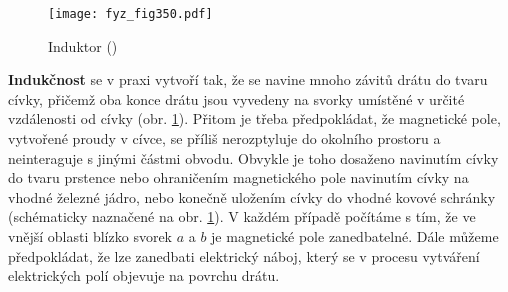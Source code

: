   \begin{figure}[ht!] %
    \centering
    \texttt{[image: fyz\_fig350.pdf]}
    \caption{Induktor
             (\cite[s.~391]{Feynman02})}
    \label{fyz:fig350}
  \end{figure}
   
  \textbf{Indukčnost} se v praxi vytvoří tak, že se navine mnoho závitů drátu do tvaru cívky, 
  přičemž oba konce drátu jsou vyvedeny na svorky umístěné v určité vzdálenosti od cívky (obr. 
  \ref{fyz:fig350}). Přitom je třeba předpokládat, že magnetické pole, vytvořené proudy v cívce, se 
  příliš nerozptyluje do okolního prostoru a neinteraguje s jinými částmi obvodu. Obvykle je toho 
  dosaženo navinutím cívky do tvaru prstence nebo ohraničením magnetického pole navinutím cívky na 
  vhodné železné jádro, nebo konečně uložením cívky do vhodné kovové schránky (schématicky 
  naznačené na obr. \ref{fyz:fig350}). V každém případě počítáme s tím, že ve vnější oblasti blízko 
  svorek \(a\) a \(b\) je magnetické pole zanedbatelné. Dále můžeme předpokládat, že lze zanedbati 
  elektrický náboj, který se v procesu vytváření elektrických polí objevuje na povrchu drátu.
  
